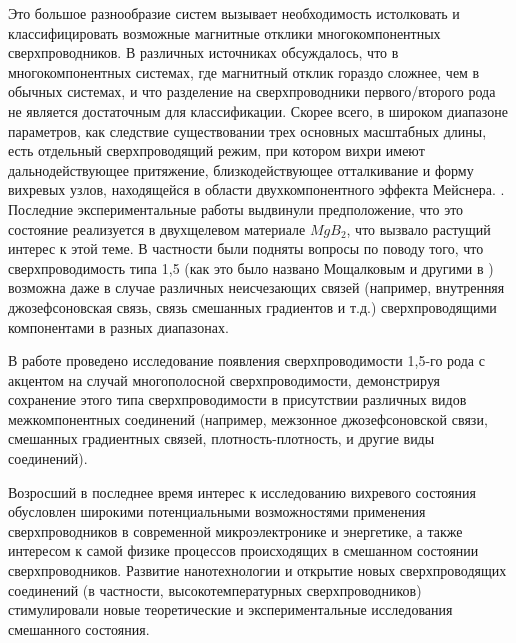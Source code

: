 Это большое разнообразие систем вызывает необходимость истолковать и 
классифицировать возможные магнитные отклики многокомпонентных 
сверхпроводников. В различных источниках обсуждалось, что в многокомпонентных 
системах, где магнитный отклик гораздо сложнее, чем в обычных системах, и что 
разделение на сверхпроводники первого/второго рода не является достаточным для 
классификации. Скорее всего, в широком диапазоне параметров, как следствие 
существовании трех основных масштабных длины, есть отдельный сверхпроводящий 
режим, при котором вихри имеют дальнодействующее притяжение, близкодействующее 
отталкивание и форму вихревых узлов, находящейся в области двухкомпонентного 
эффекта Мейснера. \cite{bib:1,bib:2}. Последние экспериментальные работы 
\cite{bib:16,bib:17} выдвинули предположение, что это состояние реализуется в 
двухщелевом материале \( MgB_2 \), что вызвало растущий интерес к этой теме. В 
частности были подняты вопросы по поводу того, что сверхпроводимость типа 1,5 
(как это было названо Мощалковым и другими в \cite{bib:16}) возможна даже в 
случае различных неисчезающих связей (например, внутренняя джозефсоновская 
связь, связь смешанных градиентов и т.д.) сверхпроводящими компонентами в 
разных диапазонах. \cite{bib:main}

В работе проведено исследование появления сверхпроводимости 1,5-го рода с 
акцентом на случай многополосной сверхпроводимости, демонстрируя сохранение 
этого типа сверхпроводимости в присутствии различных видов межкомпонентных 
соединений (например, межзонное джозефсоновской связи, смешанных градиентных 
связей, плотность-плотность, и другие виды соединений).

Возросший в последнее время интерес к исследованию вихревого состояния 
обусловлен широкими потенциальными возможностями применения сверхпроводников в 
современной микроэлектронике и энергетике, а также интересом к самой физике 
процессов происходящих в смешанном состоянии сверхпроводников. Развитие 
нанотехнологии и открытие новых сверхпроводящих соединений (в частности, 
высокотемпературных сверхпроводников) стимулировали новые теоретические и
экспериментальные исследования смешанного состояния. 

